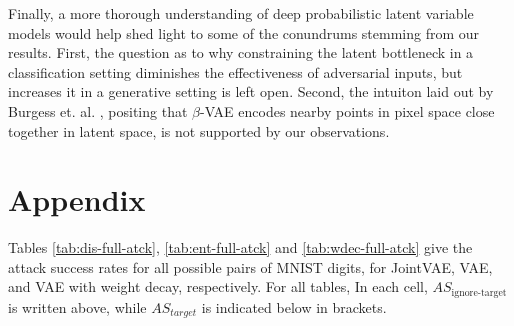 \documentclass{report}
\begin{document}
\noindent Finally, a more thorough understanding of deep probabilistic latent variable models would help shed light to some of the conundrums stemming from our results. First, the question as to why constraining the latent bottleneck in a classification setting diminishes the effectiveness of adversarial inputs, but increases it in a generative setting is left open. Second, the intuiton laid out by Burgess et. al. \cite{beta-vae}, positing that $\beta$-VAE encodes nearby points in pixel space close together in latent space, is not supported by our observations.

\chapter*{Appendix}

Tables \ref{tab:dis-full-atck}, \ref{tab:ent-full-atck} and \ref{tab:wdec-full-atck} give the attack success rates for all possible pairs of MNIST digits, for JointVAE, VAE, and VAE with weight decay, respectively. For all tables, In each cell, $AS_\text{ignore-target}$ is written above, while $AS_{target}$ is indicated below in brackets.
\end{document}
